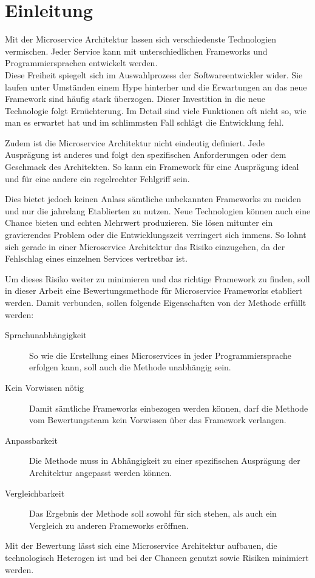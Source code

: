 \section{Einleitung}

Mit der Microservice Architektur lassen sich verschiedenste Technologien vermischen. Jeder Service kann mit unterschiedlichen Frameworks und Programmiersprachen entwickelt werden.\\
Diese Freiheit spiegelt sich im Auswahlprozess der Softwareentwickler wider. Sie laufen unter Umständen einem Hype hinterher\cite{HDD2016} und die Erwartungen an das neue Framework sind häufig stark überzogen. Dieser Investition in die neue Technologie folgt Ernüchterung. Im Detail sind viele Funktionen oft nicht so, wie man es erwartet hat und im schlimmsten Fall schlägt die Entwicklung fehl.

Zudem ist die Microservice Architektur nicht eindeutig definiert\cite[11]{Wolff2015}. Jede Ausprägung ist anderes und folgt den spezifischen Anforderungen oder dem Geschmack des Architekten. So kann ein Framework für eine Ausprägung ideal und für eine andere ein regelrechter Fehlgriff sein. 

Dies bietet jedoch keinen Anlass sämtliche unbekannten Frameworks zu meiden und nur die jahrelang Etablierten zu nutzen. Neue Technologien können auch eine Chance bieten und echten Mehrwert produzieren. Sie lösen mitunter ein gravierendes Problem oder die Entwicklungszeit verringert sich immens. So lohnt sich gerade in einer Microservice Architektur das Risiko einzugehen, da der Fehlschlag eines einzelnen Services vertretbar ist.

Um dieses Risiko weiter zu minimieren und das richtige Framework zu finden, soll in dieser Arbeit eine Bewertungsmethode für Microservice Frameworks etabliert werden. Damit verbunden, sollen folgende Eigenschaften von der Methode erfüllt werden:

\begin{description}
	\item[Sprachunabhängigkeit] 
	So wie die Erstellung eines Microservices in jeder Programmiersprache erfolgen kann, soll auch die Methode unabhängig sein.
	\item[Kein Vorwissen nötig] 
	Damit sämtliche Frameworks einbezogen werden können, darf die Methode vom Bewertungsteam kein Vorwissen über das Framework verlangen.
	\item[Anpassbarkeit] 
	Die Methode muss in Abhängigkeit zu einer spezifischen Ausprägung der Architektur angepasst werden können.
	\item[Vergleichbarkeit] 
	Das Ergebnis der Methode soll sowohl für sich stehen, als auch ein Vergleich zu anderen Frameworks eröffnen.
\end{description}

Mit der Bewertung lässt sich eine Microservice Architektur aufbauen, die technologisch Heterogen ist und bei der Chancen genutzt sowie Risiken minimiert werden.
